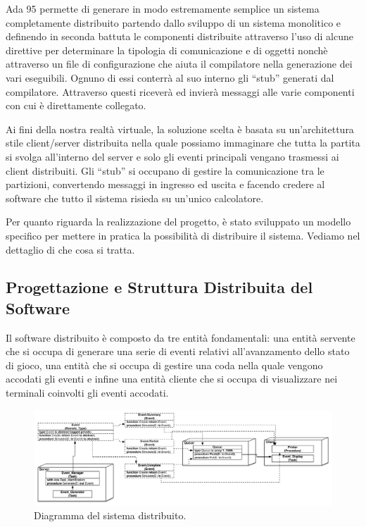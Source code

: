 \documentclass[aps,letterpaper,10pt]{article}
\begin{document}
Ada 95 permette di generare in modo estremamente semplice un sistema completamente distribuito partendo dallo sviluppo di un sistema monolitico e definendo in seconda battuta le componenti distribuite attraverso l'uso di alcune direttive per determinare la tipologia di comunicazione e di oggetti nonch\`e attraverso un file di configurazione che aiuta il compilatore nella generazione dei vari eseguibili. Ognuno di essi conterr\`a al suo interno gli ``stub'' generati dal compilatore. Attraverso questi ricever\`a ed invier\`a messaggi alle varie componenti con cui \`e direttamente collegato. \vspace{3mm}

Ai fini della nostra realt\`a virtuale, la soluzione scelta \`e basata su un'architettura stile client/server distribuita nella quale possiamo immaginare che tutta la partita si svolga all'interno del server e solo gli eventi principali vengano trasmessi ai client distribuiti. Gli ``stub'' si occupano di gestire la comunicazione tra le partizioni, convertendo messaggi in ingresso ed uscita e facendo credere al software che tutto il sistema risieda su un'unico calcolatore. \vspace{3mm}

Per quanto riguarda la realizzazione del progetto, \`e stato sviluppato un modello specifico per mettere in pratica la possibilit\`a di distribuire il sistema. Vediamo nel dettaglio di che cosa si tratta.

\subsection{Progettazione e Struttura Distribuita del Software}

Il software distribuito \`e composto da tre entit\`a fondamentali: una entit\`a servente che si occupa di generare una serie di eventi relativi all'avanzamento dello stato di gioco, una entit\`a che si occupa di gestire una coda nella quale vengono accodati gli eventi e infine una entit\`a cliente che si occupa di visualizzare nei terminali coinvolti gli eventi accodati. \vspace{3mm}

\begin{figure}[H]
	\begin{center}
		\includegraphics[width=450px]{images/distributed-system.pdf}
	\end{center}
\caption{Diagramma del sistema distribuito.}
\end{figure}
\end{document}
